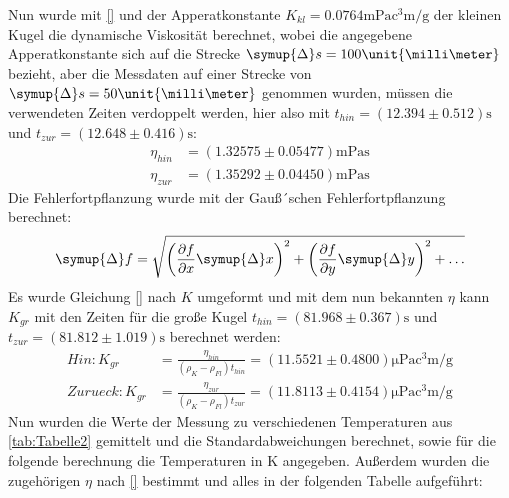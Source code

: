 Nun wurde mit \eqref{} und der Apperatkonstante $K_{kl} = 0.0764\unit{\milli\pascal\cubic\centi\meter\per\gram}$
der kleinen Kugel die dynamische Viskosität berechnet, wobei die angegebene Apperatkonstante sich auf die Strecke
$\symup{\Delta}s = 100\unit{\milli\meter}$ bezieht, aber die Messdaten auf einer Strecke von $\symup{\Delta}s = 50\unit{\milli\meter}$ genommen wurden,
müssen die verwendeten Zeiten verdoppelt werden, hier also mit $t_{hin} = (12.394\pm 0.512)\unit{\second}$ und $t_{zur} = (12.648\pm 0.416)\unit{\second}$:
\begin{align*}
  \eta_{hin} &= (1.32575\pm 0.05477)\unit{\milli\pascal\second}\\
  \eta_{zur} &= (1.35292\pm 0.04450)\unit{\milli\pascal\second}
\end{align*}
Die Fehlerfortpflanzung wurde mit der Gauß´schen Fehlerfortpflanzung berechnet:
\begin{equation*}
  \symup{\Delta}f = \sqrt{\left(\frac{\partial f}{\partial x}\symup{\Delta}x\right)^2 + \left(\frac{\partial f}{\partial y}\symup{\Delta}y\right)^2 +\ldots}
\end{equation*}
Es wurde Gleichung \eqref{} nach $K$ umgeformt und mit dem nun bekannten $\eta$ kann $K_{gr}$ mit
den Zeiten für die große Kugel $t_{hin} = (81.968\pm 0.367)\unit{\second}$ und $t_{zur} = (81.812\pm 1.019)\unit{\second}$ berechnet werden:
\begin{align*}
  Hin : K_{gr} &= \frac{\eta_{hin}}{(\rho_K-\rho_{Fl})t_{hin}} = (11.5521\pm 0.4800)\unit{\micro\pascal\cubic\centi\meter\per\gram}\\
  Zurueck : K_{gr} &= \frac{\eta_{zur}}{(\rho_K-\rho_{Fl})t_{zur}} = (11.8113\pm 0.4154)\unit{\micro\pascal\cubic\centi\meter\per\gram}
\end{align*}
Nun wurden die Werte der Messung zu verschiedenen Temperaturen aus \autoref{tab:Tabelle2} gemittelt und die Standardabweichungen berechnet, sowie für die folgende
berechnung die Temperaturen in $\unit{\kelvin}$ angegeben. Außerdem wurden die zugehörigen $\eta$ nach \eqref{} bestimmt und alles in der folgenden Tabelle aufgeführt:
